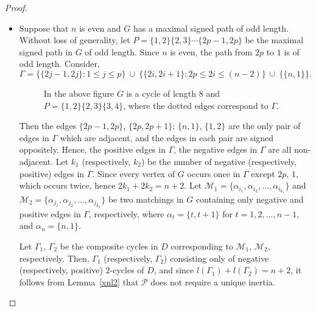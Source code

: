 \documentclass[10pt,a4paper]{amsart}
\numberwithin{equation}{section}
\begin{document}
\begin{proof}
\begin{itemize}
		\item[iii.] Suppose that $n$ is even and $G$ has a maximal signed path of odd length. Without loss of generality, let $P=\{1,2\}\{2,3\}\cdots\{2p-1,2p\}$ be the maximal signed path in $G$ of odd length. Since $n$ is even, the path from $2p$ to $1$ is of odd length.
		Consider,
		$$\Gamma=\{\{2j-1,2j\}: 1\leq j \leq p\}~\cup~\{\{2i,2i+1\}:2p\leq 2i\leq (n-2)\}~\cup~\{\{n,1\}\}. $$ 
		\begin{figure}[H]
			\tikzset{node distance=1cm}
			\centering
			\caption{ In the above figure $G$ is a cycle of length $8$ and $P=\{1,2\}\{2,3\}\{3,4\}$, where the dotted edges correspond to $\Gamma$.} \end{figure}
		Then the edges $\{2p-1,2p\}$, $\{2p,2p+1\}$; $\{n,1\}$, $\{1,2\}$ are the only pair of edges in $\Gamma$ which are adjacent, and the edges in each pair are signed oppositely. Hence, the positive edges in $\Gamma$, the negative edges in $\Gamma$ are all non-adjacent. Let $k_1$ (respectively, $k_2$) be the number of negative (respectively, positive) edges in $\Gamma$. Since every vertex of $G$ occurs once in $\Gamma$ except $2p$, $1$, which occurs twice, hence $2k_1+2k_2=n+2$. 
		Let $\mathcal{M}_1=\{\alpha_{i_1},\alpha_{i_2},..., \alpha_{i_{k_1}}\}$ and $\mathcal{M}_2=\{\alpha_{j_1},\alpha_{j_2},..., \alpha_{j_{k_2}}\}$ be two matchings in $G$ containing only negative and positive edges in $\Gamma$, respectively, where $\alpha_t=\{t,t+1\}$ for $t=1,2,...,n-1$, and $\alpha_n=\{n,1\}$. 
		
		Let $\Gamma_1$, $\Gamma_2$ be the composite cycles in $D$ corresponding to $\mathcal{M}_1$, $\mathcal{M}_2$, respectively. Then, $\Gamma_1$ (respectively, $\Gamma_2$) consisting only of negative (respectively, positive) $2$-cycles of $D$, and since $l(\Gamma_1) + l(\Gamma_2) = n + 2$, it follows from Lemma~\ref{xnl2} that $\mathcal{P}$ does not require a unique inertia. 
	\end{itemize} 
\end{proof}
\end{document}
